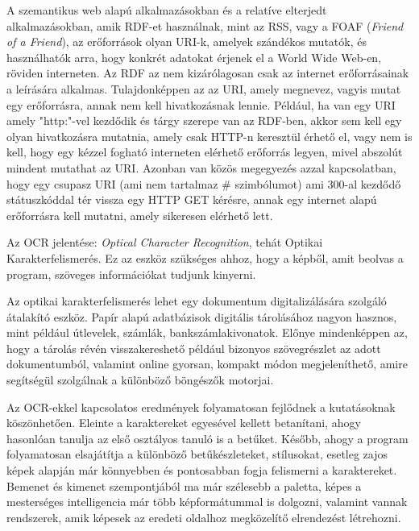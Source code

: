 A szemantikus web alapú alkalmazásokban és a relatíve elterjedt alkalmazásokban, amik RDF-et használnak, mint az RSS, vagy a FOAF (\textit{Friend of a Friend}), az erőforrások olyan URI-k, amelyek szándékos mutatók, és használhatók arra, hogy konkrét adatokat érjenek el a World Wide Web-en, röviden interneten. Az RDF az nem kizárólagosan csak az internet erőforrásainak a leírására alkalmas. Tulajdonképpen az az URI, amely megnevez, vagyis mutat egy erőforrásra, annak nem kell hivatkozásnak lennie. Például, ha van egy URI amely "http:"-vel kezdődik és tárgy szerepe van az RDF-ben, akkor sem kell egy olyan hivatkozásra mutatnia, amely csak HTTP-n keresztül érhető el, vagy nem is kell, hogy egy kézzel fogható interneten elérhető erőforrás legyen, mivel abszolút mindent mutathat az URI. Azonban van közös megegyezés azzal kapcsolatban, hogy egy csupasz URI (ami nem tartalmaz \# szimbólumot) ami 300-al kezdődő státuszkóddal tér vissza egy HTTP GET kérésre, annak egy internet alapú erőforrásra kell mutatni, amely sikeresen elérhető lett.


Az OCR jelentése: \textit{Optical Character Recognition}, tehát Optikai Karakterfelismerés. Ez az eszköz szükséges ahhoz, hogy a képből, amit beolvas a program, szöveges információkat tudjunk kinyerni.

Az optikai karakterfelismerés lehet egy dokumentum digitalizálására szolgáló átalakító eszköz. Papír alapú adatbázisok digitális tárolásához nagyon hasznos, mint például útlevelek, számlák, bankszámlakivonatok. Előnye mindenképpen az, hogy a tárolás révén visszakereshető például bizonyos szövegrészlet az adott dokumentumból, valamint online gyorsan, kompakt módon megjeleníthető, amire segítségül szolgálnak a különböző böngészők motorjai. 

Az OCR-ekkel kapcsolatos eredmények folyamatosan fejlődnek a kutatásoknak köszönhetően. Eleinte a karaktereket egyesével kellett betanítani, ahogy hasonlóan tanulja az első osztályos tanuló is a betűket. Később, ahogy a program folyamatosan elsajátítja a különböző betűkészleteket, stílusokat, esetleg zajos képek alapján már könnyebben és pontosabban fogja felismerni a karaktereket. Bemenet és kimenet szempontjából ma már szélesebb a paletta, képes a mesterséges intelligencia már több képformátummal is dolgozni, valamint vannak rendszerek, amik képesek az eredeti oldalhoz megközelítő elrendezést létrehozni.


